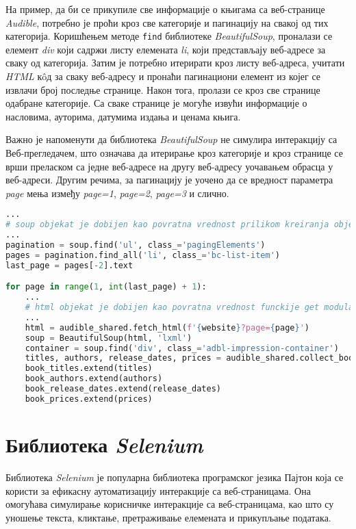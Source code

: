 \documentclass[12pt,oneside]{memoir}
\begin{document}
На пример, да би се прикупиле све информације о књигама са веб-странице \textit{Audible}, потребно је проћи кроз све категорије и пагинацију на свакој од тих категорија. Коришћењем методе \texttt{find} библиотеке \textit{BeautifulSoup}, проналази се елемент \textit{div} који садржи листу елемената \textit{li}, који представљају веб-адресе за сваку од категорија. Затим је потребно итерирати кроз листу веб-адреса, учитати \textit{HTML} кôд за сваку веб-адресу и пронаћи пагинациони елемент из којег се извлачи број последње странице. Након тога, пролази се кроз све странице одабране категорије. Са сваке странице је могуће извући информације о насловима, ауторима, датумима издања и ценама књига. 

Важно је напоменути да библиотека \textit{BeautifulSoup} не симулира интеракцију са Веб-прегледачем, што означава да итерирање кроз категорије и кроз странице се врши преласком са једне веб-адресе на другу веб-адресу уочавањем обрасца у веб-адреси. Другим речима, за пагинацију је уочено да се вредност параметра \textit{page} мења између 
\textit{page=1}, \textit{page=2}, \textit{page=3} и слично.
\begin{lstlisting}[language=Python, caption={Прикупљање података са више веб-страница}, label={lst:beautiful-soap-scrape-mutliple}]
...
# soup objekat je dobijen kao povratna vrednost prilikom kreiranja objekta tipa BeautifulSoup
...
pagination = soup.find('ul', class_='pagingElements')
pages = pagination.find_all('li', class_='bc-list-item')
last_page = pages[-2].text

for page in range(1, int(last_page) + 1):
    ...
    # html objekat je dobijen kao povratna vrednost funckije get modula requests 
    ...
    html = audible_shared.fetch_html(f'{website}?page={page}')
    soup = BeautifulSoup(html, 'lxml')
    container = soup.find('div', class_='adbl-impression-container')
    titles, authors, release_dates, prices = audible_shared.collect_books_info(container)
    book_titles.extend(titles)
    book_authors.extend(authors)
    book_release_dates.extend(release_dates)
    book_prices.extend(prices)
\end{lstlisting}

\section{Библиотека \textit{Selenium}}
\label{chp:selenium}
Библиотека \textit{Selenium} је популарна библиотека програмског језика Пајтон која се користи за ефикасну аутоматизацију интеракције са веб-страницама. Она омогућава симулирање корисничке интеракције са веб-страницама, као што су уношење текста, кликтање, претраживање елемената и прикупљање података. 
\end{document}
